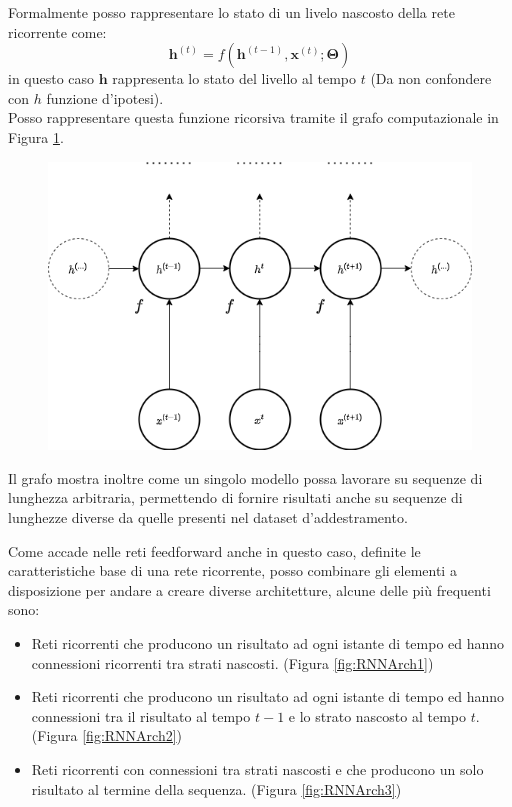 \documentclass[../../main.tex]{subfiles}
\begin{document}
Formalmente posso rappresentare lo stato di un livelo nascosto della rete ricorrente come:
\[\boldsymbol{h}^{(t)} = f(\boldsymbol{h}^{(t-1)}, \boldsymbol{x}^{(t)}; \boldsymbol{\Theta})\]
in questo caso $\boldsymbol{h}$ rappresenta lo stato del livello al tempo $t$ (Da non confondere con $h$ funzione d'ipotesi).\\
Posso rappresentare questa funzione ricorsiva tramite il grafo computazionale in Figura \ref{fig:computationgraph}.
\begin{figure}[H]
    \centering
    \includegraphics[scale = 0.4]{immagini/4_2/computation_graph.png}
    \caption{}
    \label{fig:computationgraph}
\end{figure}
Il grafo mostra inoltre come un singolo modello possa lavorare su sequenze di lunghezza arbitraria, permettendo di fornire risultati anche su sequenze di lunghezze diverse  da quelle presenti nel dataset d'addestramento.

Come accade nelle reti feedforward anche in questo caso, definite le caratteristiche base di una rete ricorrente, posso combinare gli elementi a disposizione per andare a creare diverse architetture, alcune delle più frequenti sono:

\begin{itemize}
    \item Reti ricorrenti che producono un risultato ad ogni istante di tempo ed hanno connessioni ricorrenti tra strati nascosti. (Figura \ref{fig:RNNArch1})
    \item Reti ricorrenti che producono un risultato ad ogni istante di tempo ed hanno connessioni tra il risultato al tempo $t-1$ e lo strato nascosto al tempo $t$. (Figura \ref{fig:RNNArch2})
    \item Reti ricorrenti con connessioni tra strati nascosti e che producono un solo risultato al termine della sequenza. (Figura \ref{fig:RNNArch3})
\end{itemize}
\end{document}
